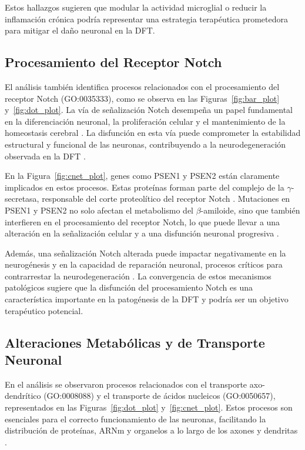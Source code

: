 Estos hallazgos sugieren que modular la actividad microglial o reducir la inflamación crónica podría representar una estrategia terapéutica prometedora para mitigar el daño neuronal en la DFT.


\subsection{Procesamiento del Receptor Notch}

El análisis también identifica procesos relacionados con el procesamiento del receptor Notch (GO:0035333), como se observa en las Figuras~\ref{fig:bar_plot} y~\ref{fig:dot_plot}. La vía de señalización Notch desempeña un papel fundamental en la diferenciación neuronal, la proliferación celular y el mantenimiento de la homeostasis cerebral \cite{kopan2009canonical}. La disfunción en esta vía puede comprometer la estabilidad estructural y funcional de las neuronas, contribuyendo a la neurodegeneración observada en la DFT \cite{abbott2019notch}.

En la Figura~\ref{fig:cnet_plot}, genes como PSEN1 y PSEN2 están claramente implicados en estos procesos. Estas proteínas forman parte del complejo de la  \(\gamma\)-secretasa, responsable del corte proteolítico del receptor Notch \cite{de2002presenilins}. Mutaciones en PSEN1 y PSEN2 no solo afectan el metabolismo del \(\beta\)-amiloide, sino que también interfieren en el procesamiento del receptor Notch, lo que puede llevar a una alteración en la señalización celular y a una disfunción neuronal progresiva \cite{sherrington1995cloning}.

Además, una señalización Notch alterada puede impactar negativamente en la neurogénesis y en la capacidad de reparación neuronal, procesos críticos para contrarrestar la neurodegeneración \cite{ables2011notch}. La convergencia de estos mecanismos patológicos sugiere que la disfunción del procesamiento Notch es una característica importante en la patogénesis de la DFT y podría ser un objetivo terapéutico potencial.


\subsection{Alteraciones Metabólicas y de Transporte Neuronal}

En el análisis se observaron procesos relacionados con el transporte axo-dendrítico (GO:0008088) y el transporte de ácidos nucleicos (GO:0050657), representados en las Figuras~\ref{fig:dot_plot} y~\ref{fig:cnet_plot}. Estos procesos son esenciales para el correcto funcionamiento de las neuronas, facilitando la distribución de proteínas, ARNm y organelos a lo largo de los axones y dendritas \cite{goldstein2001axonal}.

